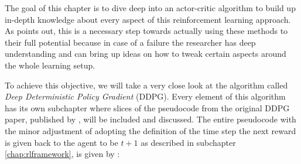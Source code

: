 The goal of this chapter is to dive deep into an actor-critic algorithm to build up in-depth knowledge about every aspect of this reinforcement learning approach. As \cite{tim2018} points out, this is a necessary step towards actually using these methods to their full potential because in case of a failure the researcher has deep understanding and can bring up ideas on how to tweak certain aspects around the whole learning setup.
\par
To achieve this objective, we will take a very close look at the algorithm called \textit{Deep Deterministic Policy Gradient} (DDPG). Every element of this algorithm has its own subchapter where slices of the pseudocode from the original DDPG paper, published by \cite{lillicrap2019continuous}, will be included and discussed. The entire pseudocode with the minor adjustment of adopting the definition of the time step the next reward is given back to the agent to be $t+1$ as described in subchapter \ref{chap:rlframework}, is given by \cite[p.~5]{lillicrap2019continuous}:
